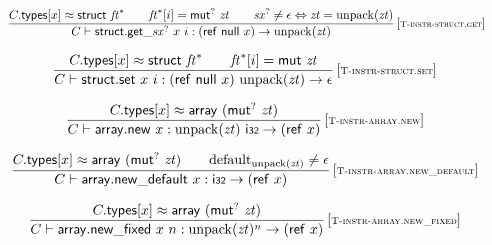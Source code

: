 $$
\begin{array}{@{}c@{}}\displaystyle
\frac{
C{.}\mathsf{types}{}[x] \approx \mathsf{struct}~{{\mathit{ft}}^\ast}
 \qquad
{{\mathit{ft}}^\ast}{}[i] = {\mathsf{mut}^?}~{\mathit{zt}}
 \qquad
{{\mathit{sx}}^?} \neq \epsilon \Leftrightarrow {\mathit{zt}} = {\mathrm{unpack}}({\mathit{zt}})
}{
C \vdash {\mathsf{struct{.}get}}{\mathsf{\_}}{{{\mathit{sx}}^?}}~x~i : (\mathsf{ref}~\mathsf{null}~x) \rightarrow {\mathrm{unpack}}({\mathit{zt}})
} \, {[\textsc{\scriptsize T{-}instr{-}struct.get}]}
\qquad
\end{array}
$$

$$
\begin{array}{@{}c@{}}\displaystyle
\frac{
C{.}\mathsf{types}{}[x] \approx \mathsf{struct}~{{\mathit{ft}}^\ast}
 \qquad
{{\mathit{ft}}^\ast}{}[i] = \mathsf{mut}~{\mathit{zt}}
}{
C \vdash \mathsf{struct{.}set}~x~i : (\mathsf{ref}~\mathsf{null}~x)~{\mathrm{unpack}}({\mathit{zt}}) \rightarrow \epsilon
} \, {[\textsc{\scriptsize T{-}instr{-}struct.set}]}
\qquad
\end{array}
$$

\vspace{1ex}

$$
\begin{array}{@{}c@{}}\displaystyle
\frac{
C{.}\mathsf{types}{}[x] \approx \mathsf{array}~({\mathsf{mut}^?}~{\mathit{zt}})
}{
C \vdash \mathsf{array{.}new}~x : {\mathrm{unpack}}({\mathit{zt}})~\mathsf{i{\scriptstyle 32}} \rightarrow (\mathsf{ref}~x)
} \, {[\textsc{\scriptsize T{-}instr{-}array.new}]}
\qquad
\end{array}
$$

$$
\begin{array}{@{}c@{}}\displaystyle
\frac{
C{.}\mathsf{types}{}[x] \approx \mathsf{array}~({\mathsf{mut}^?}~{\mathit{zt}})
 \qquad
{{\mathrm{default}}}_{{\mathrm{unpack}}({\mathit{zt}})} \neq \epsilon
}{
C \vdash \mathsf{array{.}new\_default}~x : \mathsf{i{\scriptstyle 32}} \rightarrow (\mathsf{ref}~x)
} \, {[\textsc{\scriptsize T{-}instr{-}array.new\_default}]}
\qquad
\end{array}
$$

$$
\begin{array}{@{}c@{}}\displaystyle
\frac{
C{.}\mathsf{types}{}[x] \approx \mathsf{array}~({\mathsf{mut}^?}~{\mathit{zt}})
}{
C \vdash \mathsf{array{.}new\_fixed}~x~n : {{\mathrm{unpack}}({\mathit{zt}})^{n}} \rightarrow (\mathsf{ref}~x)
} \, {[\textsc{\scriptsize T{-}instr{-}array.new\_fixed}]}
\qquad
\end{array}
$$

